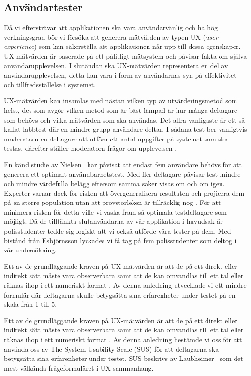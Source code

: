 \documentclass[swedish]{maucsthesis}
\begin{document}

\subsection{Användartester}

Då vi eftersträvar att applikationen ska vara användarvänlig och ha hög verkningsgrad bör vi
försöka att generera mätvärden av typen UX (\textit {user experience}) som kan säkerställa
att applikationen når upp till dessa egenskaper. UX-mätvärden är baserade på ett
pålitligt mätsystem och påvisar fakta om själva användarupplevelsen. I slutändan
ska UX-mätvärden representera en del av användarupplevelsen, detta kan vara i
form av användarnas syn på effektivitet och tillfredsställelse i systemet.

UX-mätvärden kan insamlas med nästan vilken typ av utvärderingsmetod som helst,
det som avgör vilken metod som är bäst lämpad är hur många deltagare som behövs
och vilka mätvärden som ska användas. Det allra vanligaste är ett så kallat
labbtest där en mindre grupp användare deltar. I sådana test ber vanligtvis
moderatorn en deltagare att utföra ett antal uppgifter på systemet som ska
testas, därefter ställer moderatorn frågor om upplevelsen \cite{tullis:2013}.

En känd studie av Nielsen~\cite{nielsen:2000} har påvisat att endast fem användare
behövs för att generera ett optimalt användbarhetstest. Med fler deltagare
påvisar test mindre och mindre värdefulla belägg eftersom samma saker visas om
och om igen. Experter varnar dock för risken att övergeneralisera resultaten och
projicera dem på en större population utan att provstorleken är tillräcklig nog
\cite{tullis:2013}. För att minimera risken för detta ville vi vaska fram så
optimala testdeltagare som möjligt. Då de tilltänkta slutanvändarna av vår
applikation i huvudsak är polisstudenter tedde sig logiskt att vi också
utförde våra tester på dem. Med bistånd från Esbjörnsson lyckades vi få tag
på fem polisstudenter som deltog i vår undersökning.

Ett av de grundläggande kraven på UX-mätvärden är att de på ett direkt eller
indirekt sätt måste vara observerbara samt att de kan omvandlas till ett tal
eller räknas ihop i ett numeriskt format \cite{tullis:2013}. Av denna anledning
utvecklade vi ett mindre formulär där deltagarna skulle betygsätta sina
erfarenheter under testet på en skala från 1 till 5.

Ett av de grundläggande kraven på UX-mätvärden är att de på ett direkt eller
indirekt sätt måste vara observerbara samt att de kan omvandlas till ett tal
eller räknas ihop i ett numeriskt format \cite{tullis:2013}. Av denna anledning
bestämde vi oss för att använda oss av The System Usability Scale (SUS) för att
deltagarna ska betygsätta sina erfarenheter under testet. SUS beskrivs av
Laubheimer~\cite{laubheimer:2018} som det mest välkända frågeformuläret i UX-sammanhang.
\end{document}
